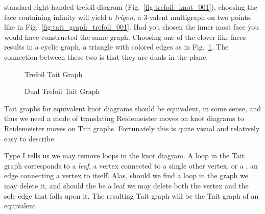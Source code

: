        standard right-handed trefoil diagram
        (Fig.~\ref{fig:trefoil_knot_001}), choosing the face containing
        infinity will yield a \textit{trigon}, a 3-valent multigraph on two
        points, like in Fig.~\ref{fig:tait_graph_trefoil_001}. Had you chosen
        the inner most face you would have constructed the same graph. Choosing
        one of the clover like faces results in a cyclic graph, a triangle with
        colored edges as in Fig.~\ref{fig:tait_graph_trefoil_002}. The
        connection between these two is that they are duals in the plane.
        \begin{figure}
            \centering
            \begin{minipage}[b]{0.49\textwidth}
                \centering
                \vspace{2em}
                \caption{Trefoil Tait Graph}
                \label{fig:tait_graph_trefoil_001}
            \end{minipage}
            \hfill
            \begin{minipage}[b]{0.49\textwidth}
                \centering
                \caption{Dual Trefoil Tait Graph}
                \label{fig:tait_graph_trefoil_002}
            \end{minipage}
        \end{figure}
        \par\hfill\par
        Tait graphs for equivalent knot diagrams should be equivalent,
        in some sense, and thus
        we need a mode of translating Reidemeister moves on knot diagrams to
        Reidemeister moves on Tait graphs. Fortunately this is quite visual and
        relatively easy to describe.
        \par\hfill\par
        Type I tells us we may remove loops in the knot diagram.
        A loop in the Tait graph
        corresponds to a \textit{leaf}, a vertex connected to a single other
        vertex, or a , an edge connecting a vertex to itself. Alas,
        should we find a loop in the graph we may delete it, and should the be
        a leaf we may delete both the vertex and the sole edge that falls upon
        it. The resulting Tait graph will be the Tait graph of an equivalent
